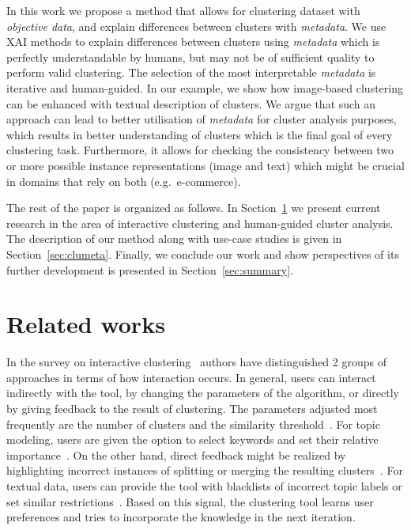 \documentclass[
 twocolumn,
 hf,
]{ceurart}
\begin{document}
In this work we propose a method that allows for clustering dataset with \textit{objective data}, and explain differences between clusters with \textit{metadata}.
We use XAI methods to explain differences between clusters using \textit{metadata} which is perfectly understandable by humans, but may not be of sufficient quality to perform valid clustering.
The selection of the most interpretable \textit{metadata} is iterative and human-guided.
In our example, we show how image-based clustering can be enhanced with textual description of clusters.
We argue that such an approach can lead to better utilisation of \textit{metadata} for cluster analysis purposes, which results in better understanding of clusters which is the final goal of every clustering task. %
Furthermore, it allows for checking the consistency between two or more possible instance representations (image and text) which might be crucial in domains that rely on both (e.g.\ e-commerce).

The rest of the paper is organized as follows.
In Section~\ref{sec:sota} we present current research in the area of interactive clustering and human-guided cluster analysis.
The description of our method along with use-case studies is given in Section~\ref{sec:clumeta}.
Finally, we conclude our work and show perspectives of its further development is presented in Section~\ref{sec:summary}.

\section{Related works}
\label{sec:sota}

In the survey on interactive clustering~\cite{10.1145/3340960} authors have distinguished 2 groups of approaches in terms of how interaction occurs.
In general, users can interact indirectly with the tool, by changing the parameters of the algorithm, or directly by giving feedback to the result of clustering.
The parameters adjusted most frequently are the number of clusters and the similarity threshold~\cite{10.1007/978-3-319-23461-8_43,10.1016/j.eswa.2017.11.055}.
For topic modeling, users are given the option to select keywords and set their relative importance~\cite{ElAssady2018ProgressiveLO}. %
On the other hand, direct feedback might be realized by highlighting incorrect instances of splitting or merging the resulting clusters~\cite{10.1155/2017/4915828}. %
For textual data, users can provide the tool with blacklists of incorrect topic labels or set similar restrictions~\cite{Chang2016AppGrouperKI}. %
Based on this signal, the clustering tool learns user preferences and tries to incorporate the knowledge in the next iteration.
\end{document}
